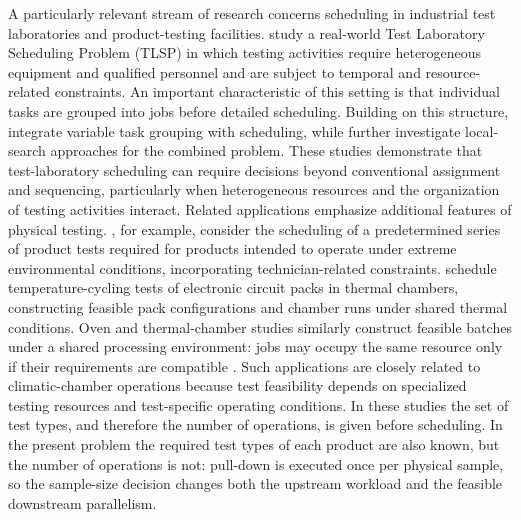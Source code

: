 A particularly relevant stream of research concerns scheduling in industrial
test laboratories and product-testing facilities.
\citet{MischekMusliu2021} study a real-world Test Laboratory Scheduling
Problem (TLSP) in which testing activities require heterogeneous equipment
and qualified personnel and are subject to temporal and resource-related
constraints.
An important characteristic of this setting is that individual tasks are
grouped into jobs before detailed scheduling.
Building on this structure, \citet{DanzingerEtAl2020} integrate variable
task grouping with scheduling, while \citet{MischekMusliuSchaerf2023}
further investigate local-search approaches for the combined problem.
These studies demonstrate that test-laboratory scheduling can require
decisions beyond conventional assignment and sequencing, particularly when
heterogeneous resources and the organization of testing activities interact.
Related applications emphasize additional features of physical testing.
\citet{MartinEtAl2022}, for example, consider the scheduling of a
predetermined series of product tests required for products intended to
operate under extreme environmental conditions, incorporating
technician-related constraints.
\citet{LittleEtAl2006} schedule temperature-cycling tests of electronic
circuit packs in thermal chambers, constructing feasible pack configurations
and chamber runs under shared thermal conditions.
Oven and thermal-chamber studies similarly construct feasible batches under
a shared processing environment: jobs may occupy the same resource only if
their requirements are compatible
\citep{LacknerMrkvickaMusliuWalkiewiczWinter2023,MajumderLahaSuganthan2018}.
Such applications are closely related to climatic-chamber operations because
test feasibility depends on specialized testing resources and test-specific
operating conditions.
In these studies the set of test types, and therefore the number of
operations, is given before scheduling.
In the present problem the required test types of each product are also
known, but the number of operations is not: pull-down is executed once per
physical sample, so the sample-size decision changes both the upstream
workload and the feasible downstream parallelism.


